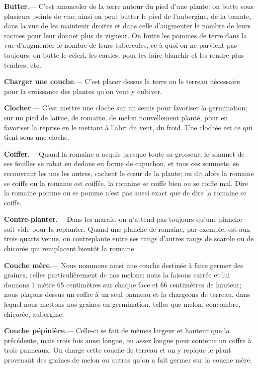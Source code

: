 \documentclass[10pt,a4paper]{book}
\begin{document}
\textbf{Butter}.--- C'est amonceler de la terre autour du pied d'une plante: on butte sous plusieurs points de vue; ainsi on peut butter le pied de l'aubergine, de la tomate, dans la vue de les maintenir droites et dans celle d'augmenter le nombre de leurs racines pour leur donner plus de vigueur. On butte les pommes de terre dans la vue d'augmenter le nombre de leurs tubercules, ce à quoi on ne parvient pas toujours; on butte le céleri, les cardes, pour les faire blanchir et les rendre plus tendres, etc.

\textbf{Charger une couche}.--- C'est placer dessus la terre ou le terreau nécessaire pour la croissance des plantes qu'on veut y cultiver.

\textbf{Clocher}.--- C'est mettre une cloche sur un semis pour favoriser la germination; sur un pied de laitue, de romaine, de melon nouvellement planté, pour en favoriser la reprise en le mettant à l'abri du vent, du froid. Une clochée est ce qui tient sous une cloche.

\textbf{Coiffer}.--- Quand la romaine a acquis presque toute sa grosseur, le sommet de ses feuilles se rabat en dedans en forme de capuchon, et tous ces sommets, se recouvrant les uns les autres, cachent le cœur de la plante; on dit alors la romaine se coiffe ou la romaine est coiffée, la romaine se coiffe bien ou se coiffe mal. Dire la romaine pomme ou se pomme n'est pas aussi exact que de dire la romaine se coiffe.

\textbf{Contre-planter}.--- Dans les marais, on n'attend pas toujours qu'une planche soit vide pour la replanter. Quand une planche de romaine, par exemple, est aux trois quarts venue, on contreplante entre ses rangs d'autres rangs de scarole ou de chicorée qui remplacent bientôt la romaine.

\textbf{Couche mère}.--- Nous nommons ainsi une couche destinée à faire germer des graines, celles particulièrement de nos melons: nous la faisons carrée et lui donnons 1 mètre 65 centimètres sur chaque face et 66 centimètres de hauteur; nous plaçons dessus un coffre à un seul panneau et la chargeons de terreau, dans lequel nous mettons nos graines en germination, telles que melon, concombre, chicorée, aubergine.

\textbf{Couche pépinière}.--- Celle-ci se fait de mêmes largeur et hauteur que la précédente, mais trois fois aussi longue, ou assez longue pour contenir un coffre à trois panneaux. On charge cette couche de terreau et on y repique le plant provenant des graines de melon ou autres qu'on a fait germer sur la couche mère.
\end{document}
